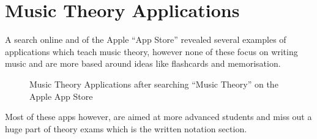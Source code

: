 \section{Music Theory Applications}
A search online and of the Apple ``App Store'' revealed several examples of applications which teach music theory, however none of these focus on writing music and are more based around ideas like flashcards and memorisation.

\begin{figure}[h!]
  \centering
  \caption{Music Theory Applications after searching ``Music Theory'' on the Apple App Store}
\end{figure}

Most of these apps however, are aimed at more advanced students and miss out a huge part of theory exams which is the written notation section.
